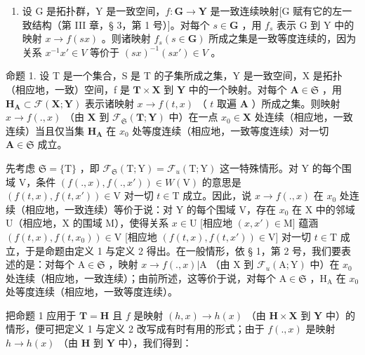 \begin{enumerate}
\def\labelenumi{\arabic{enumi})}
\setcounter{enumi}{2}
\tightlist
\item
  设 G 是拓扑群，Y 是一致空间，\(f: \mathbf{G} \to \mathbf{Y}\) 是一致连续映射{[}G 赋有它的左一致结构（第 III 章，§ 3，第 1 号）{]}。对每个 \(s \in \mathbf{G}\) ，用 \(f_s\) 表示 G 到 Y 中的映射 \(x \to f(sx)\) 。则诸映射 \(f_s(s \in \mathbf{G})\) 所成之集是一致等度连续的，因为关系 \(x^{-1}x' \in V\) 等价于 \((sx)^{-1}(sx') \in V\) 。
\end{enumerate}

命题 1. 设 T 是一个集合，S 是 T 的子集所成之集，Y 是一致空间，X 是拓扑（相应地，一致）空间，f 是 \(\mathbf{T} \times \mathbf{X}\) 到 \(\mathbf{Y}\) 中的一个映射。对每个 \(\mathbf{A} \in \mathfrak{S}\) ，用 \(\mathbf{H}_{\mathbf{A}} \subset \mathcal{F}(\mathbf{X}; \mathbf{Y})\) 表示诸映射 \(x \to f(t, x)\) （ \(t\) 取遍 \(\mathbf{A}\) ）所成之集。则映射 \(x \to f(., x)\) （由 \(\mathbf{X}\) 到 \(\mathcal{F}_{\mathfrak{S}}(\mathbf{T}; \mathbf{Y})\) 中）在一点 \(x_0 \in \mathbf{X}\) 处连续（相应地，一致连续）当且仅当集 \(\mathbf{H}_{\mathbf{A}}\) 在 \(x_0\) 处等度连续（相应地，一致等度连续）对一切 \(\mathbf{A} \in \mathfrak{S}\) 成立。

先考虑 \(\mathfrak{S} = \{\mathrm{T}\}\) ，即 \(\mathcal{F}_{\mathfrak{S}}(\mathrm{T};\mathrm{Y}) = \mathcal{F}_u(\mathrm{T};\mathrm{Y})\) 这一特殊情形。对 Y 的每个围域 V，条件 \((f(.,x),f(.,x'))\in W(\mathrm{V})\) 的意思是 \((f(t,x),f(t,x'))\in \mathrm{V}\) 对一切 \(t\in \mathrm{T}\) 成立。因此，说 \(x\to f(.,x)\) 在 \(x_0\) 处连续（相应地，一致连续）等价于说：对 Y 的每个围域 V，存在 \(x_0\) 在 X 中的邻域 U（相应地，X 的围域 M），使得关系 \(x\in \mathrm{U}\) {[}相应地 \((x,x')\in \mathrm{M}]\) 蕴涵 \((f(t,x),f(t,x_0))\in \mathrm{V}\) {[}相应地 \((f(t,x),f(t,x'))\in \mathrm{V}]\) 对一切 \(t\in \mathrm{T}\) 成立，于是命题由定义 1 与定义 2 得出。在一般情形，依 § 1，第 2 号，我们要表述的是：对每个 \(\mathrm{A}\in \mathfrak{S}\) ，映射 \(x\rightarrow f(.,x)|\mathrm{A}\) （由 X 到 \(\mathcal{F}_u(\mathrm{A};\mathrm{Y})\) 中）在 \(x_0\) 处连续（相应地，一致连续）；由前所述，这等价于说，对每个 \(\mathrm{A}\in \mathfrak{S}\) ，\(\mathrm{H}_{\mathrm{A}}\) 在 \(x_0\) 处等度连续（相应地，一致等度连续）。

把命题 1 应用于 \(\mathbf{T} = \mathbf{H}\) 且 \(f\) 是映射 \((h, x) \to h(x)\) （由 \(\mathbf{H} \times \mathbf{X}\) 到 \(\mathbf{Y}\) 中）的情形，便可把定义 1 与定义 2 改写成有时有用的形式；由于 \(f(., x)\) 是映射 \(h \to h(x)\) （由 \(\mathbf{H}\) 到 \(\mathbf{Y}\) 中），我们得到：

